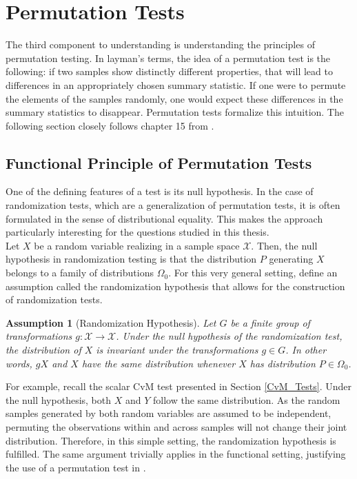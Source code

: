 \documentclass[12pt, a4paper]{article}
\theoremstyle{MAstyle} \newtheorem{assumption}{Assumption}[section]
\theoremstyle{MAstyle} \newtheorem{definition}{Definition}[section]
\theoremstyle{MAstyle} \newtheorem{theorem}{Theorem}[section]
\begin{document}
	\section{Permutation Tests}\label{Permutation_Tests}
		The third component to understanding \cite{bugni_permutation_2021} is understanding the principles of permutation testing.
		In layman's terms, the idea of a permutation test is the following: if two samples show distinctly different properties, that will lead to differences in an appropriately chosen summary statistic. If one were to permute the elements of the samples randomly, one would expect these differences in the summary statistics to disappear.
		Permutation tests formalize this intuition. The following section closely follows chapter 15 from \cite{lehmann_testing_2005}.
	
		\subsection{Functional Principle of Permutation Tests}\label{perm_tests}
			One of the defining features of a test is its null hypothesis. In the case of randomization tests, which are a generalization of permutation tests, it is often formulated in the sense of distributional equality.  This makes the approach particularly interesting for the questions studied in this thesis. \\
						
			Let $X$ be a random variable realizing in a sample space $\mathcal{X}$. Then, the null hypothesis in randomization testing is that the distribution $P$ generating $X$ belongs to a family of distributions $\Omega_0$. For this very general setting, \cite{lehmann_testing_2005} define an assumption called the randomization hypothesis that allows for the construction of randomization tests.
			
			\begin{assumption}[Randomization Hypothesis]\label{rand_hypo}
				 Let $G$ be a finite group of transformations $g: \mathcal{X} \rightarrow \mathcal{X}$. Under the null hypothesis of the randomization test, the distribution of $X$ is invariant under the transformations $g \in G$. In other words, $gX$ and $X$ have the same distribution whenever $X$ has distribution $P \in \Omega_0$.
			\end{assumption}
			For example, recall the scalar CvM test presented in Section \ref{CvM_Tests}. Under the null hypothesis, both $X$ and $Y$ follow the same distribution. As the random samples generated by both random variables are assumed to be independent, permuting the observations within and across samples will not change their joint distribution. Therefore, in this simple setting, the randomization hypothesis is fulfilled. The same argument trivially applies in the functional setting, justifying the use of a permutation test in \cite{bugni_permutation_2021}.	\\
					
\end{document}
